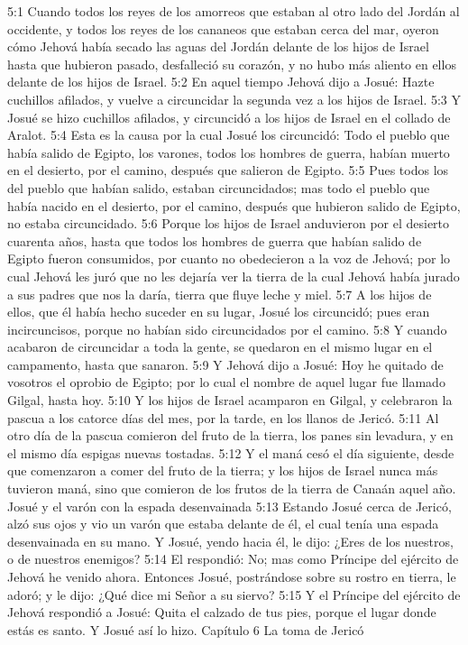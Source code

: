 5:1 Cuando todos los reyes de los amorreos que estaban al otro lado del Jordán al occidente, y todos los reyes de los cananeos que estaban cerca del mar, oyeron cómo Jehová había secado las aguas del Jordán delante de los hijos de Israel hasta que hubieron pasado, desfalleció su corazón, y no hubo más aliento en ellos delante de los hijos de Israel.  
5:2 En aquel tiempo Jehová dijo a Josué: Hazte cuchillos afilados, y vuelve a circuncidar la segunda vez a los hijos de Israel.  
5:3 Y Josué se hizo cuchillos afilados, y circuncidó a los hijos de Israel en el collado de Aralot.  
5:4 Esta es la causa por la cual Josué los circuncidó: Todo el pueblo que había salido de Egipto, los varones, todos los hombres de guerra, habían muerto en el desierto, por el camino, después que salieron de Egipto.  
5:5 Pues todos los del pueblo que habían salido, estaban circuncidados; mas todo el pueblo que había nacido en el desierto, por el camino, después que hubieron salido de Egipto, no estaba circuncidado.  
5:6 Porque los hijos de Israel anduvieron por el desierto cuarenta años, hasta que todos los hombres de guerra que habían salido de Egipto fueron consumidos, por cuanto no obedecieron a la voz de Jehová; por lo cual Jehová les juró que no les dejaría ver la tierra de la cual Jehová había jurado a sus padres que nos la daría, tierra que fluye leche y miel. 
5:7 A los hijos de ellos, que él había hecho suceder en su lugar, Josué los circuncidó; pues eran incircuncisos, porque no habían sido circuncidados por el camino.  
5:8 Y cuando acabaron de circuncidar a toda la gente, se quedaron en el mismo lugar en el campamento, hasta que sanaron.  
5:9 Y Jehová dijo a Josué: Hoy he quitado de vosotros el oprobio de Egipto; por lo cual el nombre de aquel lugar fue llamado Gilgal, hasta hoy.  
5:10 Y los hijos de Israel acamparon en Gilgal, y celebraron la pascua a los catorce días del mes, por la tarde, en los llanos de Jericó.  
5:11 Al otro día de la pascua comieron del fruto de la tierra, los panes sin levadura, y en el mismo día espigas nuevas tostadas.  
5:12 Y el maná cesó el día siguiente, desde que comenzaron a comer del fruto de la tierra; y los hijos de Israel nunca más tuvieron maná, sino que comieron de los frutos de la tierra de Canaán aquel año.  
Josué y el varón con la espada desenvainada  
5:13 Estando Josué cerca de Jericó, alzó sus ojos y vio un varón que estaba delante de él, el cual tenía una espada desenvainada en su mano. Y Josué, yendo hacia él, le dijo: ¿Eres de los nuestros, o de nuestros enemigos?  
5:14 El respondió: No; mas como Príncipe del ejército de Jehová he venido ahora. Entonces Josué, postrándose sobre su rostro en tierra, le adoró; y le dijo: ¿Qué dice mi Señor a su siervo?  
5:15 Y el Príncipe del ejército de Jehová respondió a Josué: Quita el calzado de tus pies, porque el lugar donde estás es santo. Y Josué así lo hizo.  
Capítulo 6 
La toma de Jericó  

